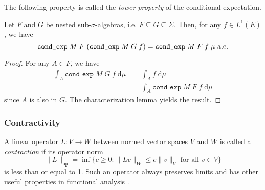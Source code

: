 The following property is called the \textit{tower property} of the conditional expectation.

\begin{lemma}
	Let $F$ and $G$ be nested sub-$\sigma$-algebras, i.e. $F \subseteq G \subseteq \Sigma$. Then, for any $f \in L^1(E)$, we have
	\[
		\normalfont \texttt{cond\_exp} \; M \; F \; (\texttt{cond\_exp} \; M \; G \; f) = \texttt{cond\_exp} \; M \; F \; f \; \mu\textrm{-a.e.}
	\]
\end{lemma}
\begin{proof}
	For any $A \in F$, we have
	\begin{align*}
		\int_A \texttt{cond\_exp} \; M \; G \; f \; \textrm{d} \mu &= \int_A f \; \textrm{d} \mu \\
		&= \int_A \texttt{cond\_exp} \; M \; F \; f \; \textrm{d} \mu
	\end{align*}
	since $A$ is also in $G$. The characterization lemma yields the result.
\end{proof}

\subsubsection{Contractivity}

A linear operator $L : V \rightarrow W$ between normed vector spaces $V$ and $W$ is called a \textit{contraction} if its operator norm
\[
	\lVert L \rVert_{\texttt{op}} = \inf\{ c \geq 0 : \lVert Lv \rVert_W \leq c \lVert v \rVert_V \textrm{ for all } v \in V \}
\]
is less than or equal to 1. Such an operator always preserves limits and has other useful properties in functional analysis \cite{sznagy2010}.

